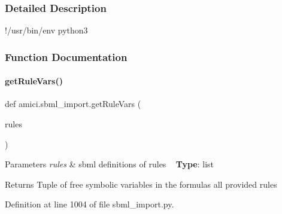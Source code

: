 \subsubsection{Detailed Description}
!/usr/bin/env python3 

\subsubsection{Function Documentation}
\mbox{\label{namespaceamici_1_1sbml__import_a64a5d0187cb4b3f69bceceb7d5638691}} 
\paragraph{\texorpdfstring{get\+Rule\+Vars()}{getRuleVars()}}
{\footnotesize\ttfamily def amici.\+sbml\+\_\+import.\+get\+Rule\+Vars (\begin{DoxyParamCaption}\item[{}]{rules }\end{DoxyParamCaption})}


\begin{DoxyParams}{Parameters}
{\em rules} & sbml definitions of rules ~\newline
{\bfseries Type}\+: list\\
\hline
\end{DoxyParams}
\begin{DoxyReturn}{Returns}
Tuple of free symbolic variables in the formulas all provided rules 
\end{DoxyReturn}


Definition at line 1004 of file sbml\+\_\+import.\+py.

